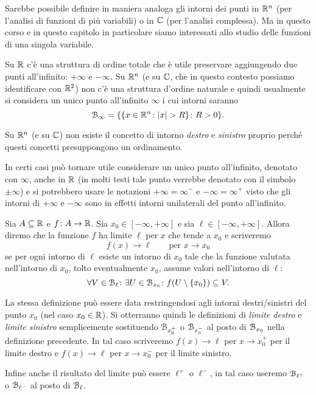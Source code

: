 \begin{remark}
Sarebbe possibile definire in maniera analoga gli intorni dei punti in ${\mathbb R}^n$
(per l'analisi di funzioni di più variabili)
o in ${\mathbb C}$ (per l'analisi complessa).
Ma in questo corso e in questo capitolo in particolare siamo interessati 
allo studio delle funzioni di una singola variabile.

Su ${\mathbb R}$ c'è una struttura di ordine totale che è utile preservare aggiungendo
due punti all'infinito: $+\infty$ e $-\infty$.
Su ${\mathbb R}^n$ (e su ${\mathbb C}$, che in questo contesto possiamo identificare con ${\mathbb R}^2$)
non c'è una struttura d'ordine naturale e quindi
usualmente si considera un unico punto all'infinito $\infty$ i cui intorni
saranno
\[
  \mathcal B_\infty = {\left\{ {\left\{ x \in {\mathbb R}^n\colon {\left|x\right|}>R \right\}}\colon R>0 \right\}}.
\]

Su ${\mathbb R}^n$ (e su ${\mathbb C}$) non esiste il concetto di intorno \emph{destro}
e \emph{sinistro} proprio perché questi concetti presuppongono un ordinamento.

In certi casi può tornare utile considerare un unico punto all'infinito,
denotato con $\infty$, anche in ${\mathbb R}$ (in molti testi tale punto verrebbe
denotato con il simbolo $\pm\infty$)
e si potrebbero usare le notazioni $+\infty = \infty^-$ e $-\infty = \infty^
+$ visto che gli intorni di $+\infty$ e $-\infty$ sono in effetti intorni
unilaterali del punto all'infinito.
\end{remark}

\begin{definition}
\mymark{***}
Sia $A\subseteq {\mathbb R}$ e $f\colon A \to {\mathbb R}$. 
Sia $x_0\in [-\infty,+\infty]$
e sia $\ell \in [-\infty,+\infty]$.
Allora diremo che la funzione $f$ ha limite $\ell$ per $x$ che tende a $x_0$ 
e scriveremo%
\[
  f(x) \to \ell \qquad \text{per $x\to x_0$}
\]
se per ogni intorno di $\ell$ esiste un intorno di $x_0$ tale che
la funzione valutata nell'intorno di $x_0$, tolto eventualmente $x_0$,
assume valori
nell'intorno di $\ell$:
\begin{equation}\label{eq:def_limite}
  \forall V \in \mathcal B_\ell \colon \exists U \in \mathcal B_{x_0} \colon f(U\setminus{\left\{ x_0 \right\}}) \subseteq V.
\end{equation}

La stessa definizione può essere data restringendosi agli intorni destri/sinistri del punto $x_0$ (nel caso $x_0 \in {\mathbb R}$). Si otterranno quindi le definizioni
di \emph{limite destro} e \emph{limite sinistro}
%
semplicemente sostituendo $\mathcal B_{x_0^+}$ o $\mathcal B_{x_0^-}$ al posto di 
$\mathcal B_{x_0}$ nella definizione
precedente. 
In tal caso scriveremo $f(x)\to \ell$ per $x\to x_0^+$ per il limite 
destro e $f(x)\to \ell$ per $x\to x_0^-$ per il limite sinistro.

Infine anche il risultato del limite può essere $\ell^+$ o $\ell^-$, 
in tal caso useremo $\mathcal B_{\ell^+}$ o $\mathcal B_{\ell^-}$ 
al posto di $\mathcal B_{\ell}$.
\end{definition}
  
